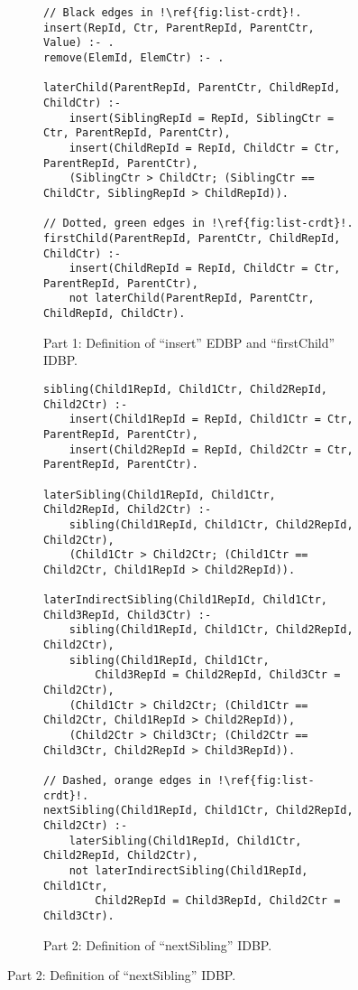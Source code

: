 \begin{figure}[htpb]
    \centering

    \begin{subfigure}[b]{\textwidth}
        \begin{lstlisting}[keepspaces,escapechar=!]
// Black edges in !\ref{fig:list-crdt}!.
insert(RepId, Ctr, ParentRepId, ParentCtr, Value) :- .
remove(ElemId, ElemCtr) :- .

laterChild(ParentRepId, ParentCtr, ChildRepId, ChildCtr) :-
    insert(SiblingRepId = RepId, SiblingCtr = Ctr, ParentRepId, ParentCtr),
    insert(ChildRepId = RepId, ChildCtr = Ctr, ParentRepId, ParentCtr),
    (SiblingCtr > ChildCtr; (SiblingCtr == ChildCtr, SiblingRepId > ChildRepId)).

// Dotted, green edges in !\ref{fig:list-crdt}!.
firstChild(ParentRepId, ParentCtr, ChildRepId, ChildCtr) :-
    insert(ChildRepId = RepId, ChildCtr = Ctr, ParentRepId, ParentCtr),
    not laterChild(ParentRepId, ParentCtr, ChildRepId, ChildCtr).\end{lstlisting}
        \caption{Part 1: Definition of ``insert'' \ac{EDBP} and ``firstChild'' \ac{IDBP}.}\label{code:list-crdt-datalog-dialect-part1}
    \end{subfigure}

    \vspace{1em}

    \begin{subfigure}[b]{\textwidth}
        \begin{lstlisting}[keepspaces,escapechar=!]
sibling(Child1RepId, Child1Ctr, Child2RepId, Child2Ctr) :-
    insert(Child1RepId = RepId, Child1Ctr = Ctr, ParentRepId, ParentCtr),
    insert(Child2RepId = RepId, Child2Ctr = Ctr, ParentRepId, ParentCtr).

laterSibling(Child1RepId, Child1Ctr, Child2RepId, Child2Ctr) :-
    sibling(Child1RepId, Child1Ctr, Child2RepId, Child2Ctr),
    (Child1Ctr > Child2Ctr; (Child1Ctr == Child2Ctr, Child1RepId > Child2RepId)).

laterIndirectSibling(Child1RepId, Child1Ctr, Child3RepId, Child3Ctr) :-
    sibling(Child1RepId, Child1Ctr, Child2RepId, Child2Ctr),
    sibling(Child1RepId, Child1Ctr,
        Child3RepId = Child2RepId, Child3Ctr = Child2Ctr),
    (Child1Ctr > Child2Ctr; (Child1Ctr == Child2Ctr, Child1RepId > Child2RepId)),
    (Child2Ctr > Child3Ctr; (Child2Ctr == Child3Ctr, Child2RepId > Child3RepId)).

// Dashed, orange edges in !\ref{fig:list-crdt}!.
nextSibling(Child1RepId, Child1Ctr, Child2RepId, Child2Ctr) :-
    laterSibling(Child1RepId, Child1Ctr, Child2RepId, Child2Ctr),
    not laterIndirectSibling(Child1RepId, Child1Ctr,
        Child2RepId = Child3RepId, Child2Ctr = Child3Ctr).\end{lstlisting}
        \caption{Part 2: Definition of ``nextSibling'' \ac{IDBP}.}\label{code:list-crdt-datalog-dialect-part2}
    \end{subfigure}
\end{figure}

